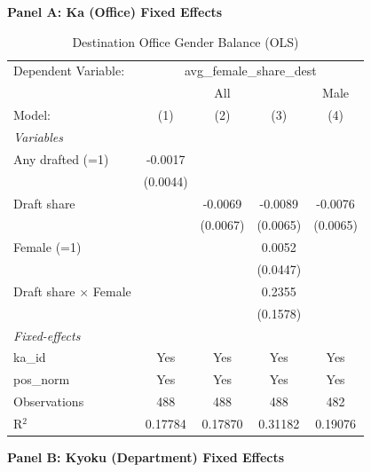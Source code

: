 \begin{table}[htbp]
\centering
\begin{threeparttable}
\caption{Destination Office Gender Balance (OLS)}
\label{tab:dest-gender-balance}
\small
\textbf{Panel A: Ka (Office) Fixed Effects}\\[1ex]
\begingroup
\centering
\begin{tabular}{lcccc}
   \tabularnewline \midrule \midrule
   Dependent Variable: & \multicolumn{4}{c}{avg\_female\_share\_dest}\\
    & \multicolumn{3}{c}{All} & Male \\ 
   Model:                       & (1)      & (2)      & (3)      & (4)\\  
   \midrule
   \emph{Variables}\\
   Any drafted (=1)             & -0.0017  &          &          &   \\   
                                & (0.0044) &          &          &   \\   
   Draft share                  &          & -0.0069  & -0.0089  & -0.0076\\   
                                &          & (0.0067) & (0.0065) & (0.0065)\\   
   Female (=1)                  &          &          & 0.0052   &   \\   
                                &          &          & (0.0447) &   \\   
   Draft share $\times$ Female  &          &          & 0.2355   &   \\   
                                &          &          & (0.1578) &   \\   
   \midrule
   \emph{Fixed-effects}\\
   ka\_id                       & Yes      & Yes      & Yes      & Yes\\  
   pos\_norm                    & Yes      & Yes      & Yes      & Yes\\  
   \midrule
   Observations                 & 488      & 488      & 488      & 482\\  
   R$^2$                        & 0.17784  & 0.17870  & 0.31182  & 0.19076\\  
   \midrule \midrule
\end{tabular}
\par\endgroup
\vspace{2ex}
\textbf{Panel B: Kyoku (Department) Fixed Effects}\\[1ex]

\end{threeparttable}
\end{table}
